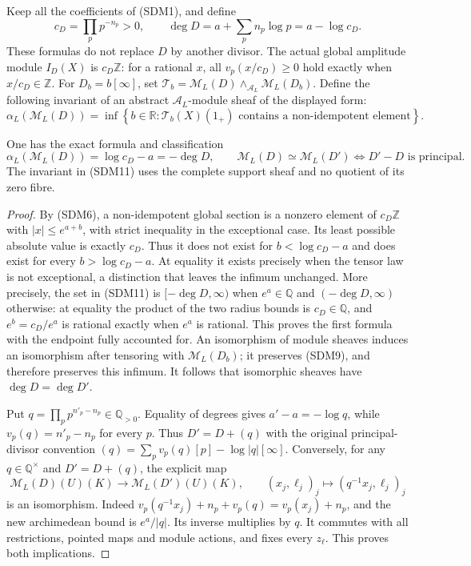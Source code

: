 Keep all the coefficients of (SDM1), and define
\begin{equation}\tag{SDM10}
 c_D=\prod_p p^{-n_p}>0,\qquad
 \deg D=a+\sum_p n_p\log p=a-\log c_D.
\end{equation}
These formulas do not replace $D$ by another divisor. The actual
global amplitude module $I_D(X)$ is $c_D\mathbb Z$: for a rational
$x$, all $v_p(x/c_D)\ge0$ hold exactly when $x/c_D\in\mathbb Z$.
For $D_b=b[\infty]$, set
$\mathcal T_b=\mathcal M_L(D)\wedge_{\mathcal A_L}\mathcal M_L(D_b)$.
Define the following invariant of an abstract
$\mathcal A_L$-module sheaf of the displayed form:
\begin{equation}\tag{SDM11}
 \alpha_L(\mathcal M_L(D))=
 \inf\left\{b\in\mathbb R:
 \mathcal T_b(X)(1_+)
 \text{ contains a non-idempotent element}\right\}.
\end{equation}
\begin{theorem}\label{SDM:degree}
One has the exact formula and classification
\begin{equation}\tag{SDM12}
 \alpha_L(\mathcal M_L(D))=\log c_D-a=-\deg D,
 \qquad
 \mathcal M_L(D)\simeq\mathcal M_L(D')
 \Longleftrightarrow D'-D\text{ is principal}.
\end{equation}
The invariant in (SDM11) uses the complete support sheaf and no
quotient of its zero fibre.
\end{theorem}
\begin{proof}
By (SDM6), a non-idempotent global section is a nonzero element of
$c_D\mathbb Z$ with $|x|\le e^{a+b}$, with strict inequality in
the exceptional case. Its least possible absolute value is exactly
$c_D$. Thus it does not exist for $b<\log c_D-a$ and does exist
for every $b>\log c_D-a$. At equality it exists precisely when
the tensor law is not exceptional, a distinction that leaves the
infimum unchanged. More precisely, the set in (SDM11) is
$[-\deg D,\infty)$ when $e^a\in\mathbb Q$ and
$(-\deg D,\infty)$ otherwise: at equality the product of the
two radius bounds is $c_D\in\mathbb Q$, and $e^b=c_D/e^a$ is
rational exactly when $e^a$ is rational. This proves the first
formula with the endpoint fully accounted for. An isomorphism of module sheaves induces an
isomorphism after tensoring with $\mathcal M_L(D_b)$; it preserves
(SDM9), and therefore preserves this infimum. It follows that
isomorphic sheaves have $\deg D=\deg D'$.

Put $q=\prod_p p^{n'_p-n_p}\in\mathbb Q_{>0}$. Equality of degrees
gives $a'-a=-\log q$, while $v_p(q)=n'_p-n_p$ for every $p$.
Thus $D'=D+(q)$ with the original principal-divisor convention
$(q)=\sum_pv_p(q)[p]-\log|q|[\infty]$. Conversely, for any
$q\in\mathbb Q^\times$ and $D'=D+(q)$, the explicit map
\begin{equation}\tag{SDM13}
 \mathcal M_L(D)(U)(K)\longrightarrow\mathcal M_L(D')(U)(K),
 \qquad(x_j,\ell_j)_j\longmapsto(q^{-1}x_j,\ell_j)_j
\end{equation}
is an isomorphism. Indeed
$v_p(q^{-1}x_j)+n_p+v_p(q)=v_p(x_j)+n_p$, and the new
archimedean bound is $e^a/|q|$. Its inverse multiplies by $q$.
It commutes with all restrictions, pointed maps and module actions,
and fixes every $z_\ell$. This proves both implications.
\end{proof}

